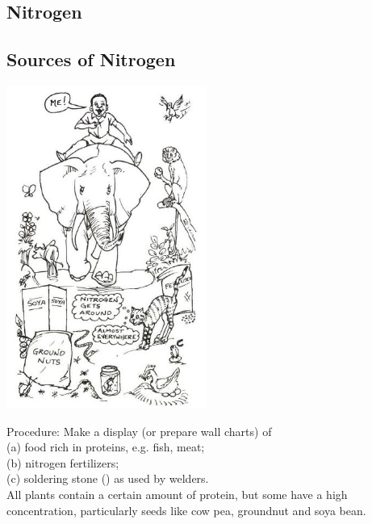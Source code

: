 \begin{multicols}{2}

\section*{Nitrogen}


\subsection{Sources of Nitrogen}

\begin{center}
\includegraphics[width=0.49\textwidth]{./img/source/nitrogen-sources.jpg}
\end{center}

\begin{description*}
\item[Procedure:]{Make a display (or prepare wall
charts) of\\
(a) food rich in proteins, e.g. fish, meat;\\
(b) nitrogen fertilizers;\\
(c) soldering stone () as used by welders.\\
All plants contain a certain amount of protein,
but some have a high concentration, particularly
seeds like cow pea, groundnut and soya bean.}
\end{description*}


\end{multicols}

